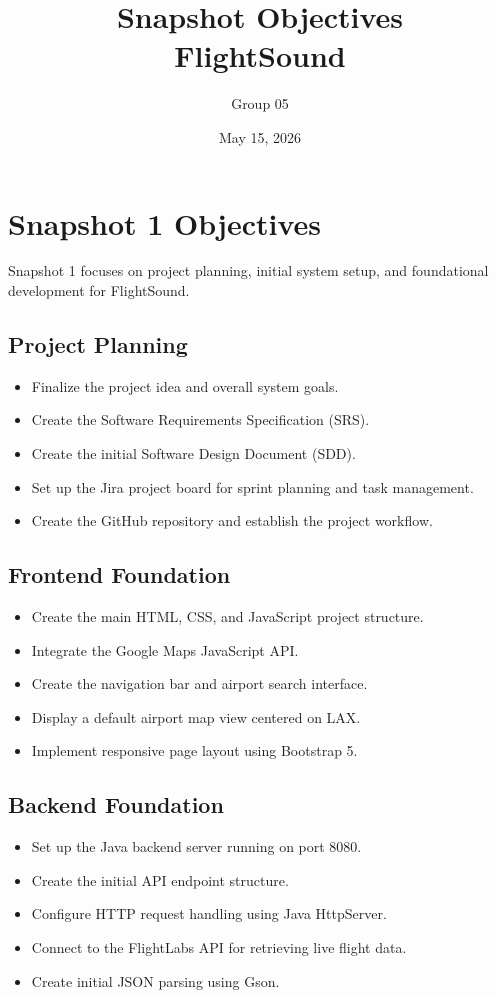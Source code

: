 \documentclass[12pt]{article}
\title{Snapshot Objectives\\FlightSound}
\author{Group 05}
\date{May 15, 2026}
\begin{document}
\maketitle
\newpage

\tableofcontents
\newpage

\section{Snapshot 1 Objectives}

Snapshot 1 focuses on project planning, initial system setup, and foundational development for FlightSound.

\subsection{Project Planning}
\begin{itemize}
\item Finalize the project idea and overall system goals.
\item Create the Software Requirements Specification (SRS).
\item Create the initial Software Design Document (SDD).
\item Set up the Jira project board for sprint planning and task management.
\item Create the GitHub repository and establish the project workflow.
\end{itemize}

\subsection{Frontend Foundation}
\begin{itemize}
\item Create the main HTML, CSS, and JavaScript project structure.
\item Integrate the Google Maps JavaScript API.
\item Create the navigation bar and airport search interface.
\item Display a default airport map view centered on LAX.
\item Implement responsive page layout using Bootstrap 5.
\end{itemize}

\subsection{Backend Foundation}
\begin{itemize}
\item Set up the Java backend server running on port 8080.
\item Create the initial API endpoint structure.
\item Configure HTTP request handling using Java HttpServer.
\item Connect to the FlightLabs API for retrieving live flight data.
\item Create initial JSON parsing using Gson.
\end{itemize}
\end{document}

